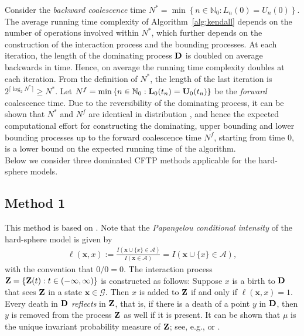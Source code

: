 \documentclass[11pt]{article}
\newcommand{\mbb}{\mathbb}
\newcommand{\lt}{\left}
\newcommand{\rt}{\right}
\newcommand{\lfs}{\mathbf{x}}
\begin{document}
Consider the {\it backward coalescence} time {${N^* = \min\left\{n \in \mbb{N}_0: L_n(0) = U_n(0) \right\}}$.}
The average running time complexity of Algorithm~\ref{alg:kendall} depends on the number of operations involved within $N^*$, which further depends on the construction of the interaction process and the bounding  processes. 
At each iteration, the length of the dominating process $\mathbf{D}$ is doubled on average backwards in time. Hence, on average the running time complexity doubles at each iteration.
From the definition of $N^*$, the length of the last iteration is $2^{\lceil\log_2 N^*\rceil} \geq N^*$.
Let ${N^f = \min\lt\{n \in \mbb{N}_0: \mL_0(t_n) = \mU_0(t_n) \rt\}}$ be the {\it forward} coalescence time.
Due to the reversibility of the dominating process, it can be shown that $N^*$ and $N^f$ are identical in distribution \cite{AG07},
and hence the expected computational effort for constructing the dominating, upper bounding  and lower bounding processes up to the forward coalescence time $N^f$,
starting from time $0$, is a lower bound on the expected running time of the algorithm.\\

Below we consider three dominated CFTP methods applicable for the hard-sphere models.

\subsection{Method 1}
\label{sec:kendall}
This method is based on \cite{KM00}. 
Note that the {\em Papangelou conditional intensity} of the hard-sphere model is given by
\begin{align}
\label{eqn:Papangelou_HS}
 \ell(\lfs, x) := \frac{I\lt(\lfs\cup\{x\} \in \mathscr{A}\rt) }{I\lt(\lfs \in \mathscr{A}\rt)} = I\lt(\lfs\cup\{x\} \in \mathscr{A}\rt),
\end{align}
with the convention that $0/0 = 0$. The interaction process $\mathbf{Z} = \{\mathbf{Z}(t): t \in (-\infty, \infty)\}$ is constructed as follows: Suppose $x$ is a birth to $\mathbf{D}$ that sees $\mathbf{Z}$ in
a state $\lfs \in  {\mathscr{G}}$.  Then $x$ is added to $\mathbf{Z}$ if and only if $\ell(\lfs, x) = 1$.
Every death in $\mathbf{D}$ {\em reflects} in $\mathbf{Z}$, that is, if there is a death of a point $y$ in $\mathbf{D}$, then $y$ is removed from the process $\mathbf{Z}$ as well if it is present.
It can be shown that $\mu$ is the unique invariant  probability measure of $\mathbf{Z}$; see, e.g., \cite{GNL00} or \cite{FFG02}.\\
\end{document}
